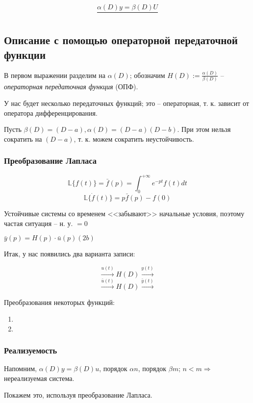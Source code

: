 \documentclass[main.tex]{subfiles}
\begin{document}
$$ \frac{\alpha(D)y = \beta(D)U}{ } $$ %

\subsection{Описание с помощью операторной передаточной функции}

В первом выражении разделим на $ \alpha(D) $; обозначим $ H(D) := \frac{\alpha(D)}{\beta(D)} $ -- \emph{операторная передаточная функция} (ОПФ).

У нас будет несколько передаточных функций; это -- операторная, т. к. зависит от оператора дифференцирования.

Пусть $ \beta(D) = (D - a), \alpha(D) = (D-a)(D-b) $. 
При этом нельзя сократить на $ (D - a) $, т. к. можем сократить неустойчивость. %

\subsubsection{Преобразование Лапласа}

$$ \mathds{L}\{f(t)\} = \bar{f}(p) = \int_0^{+\infty} e^{-pt} f(t) dt $$
$$ \mathds{L}\{\dot f (t)\} = p \bar{f}(p)- f(0) $$

Устойчивые системы со временем <<забывают>> начальные условия, поэтому частая ситуация -- н. у. $= 0$


$ \boxed{\bar{y}(p) = H(p) \cdot \bar{u}(p) }  (2b) $ %

Итак, у нас появились два варианта записи:

$$ \xrightarrow{u(t)} \boxed{H(D)}\xrightarrow{y(t)} $$
$$ \xrightarrow{\bar u(t)} \boxed{H(D)} \xrightarrow{ \bar y(t)} $$

Преобразования некоторых функций: %

\begin{enumerate}[noitemsep]
    \item
    \item
\end{enumerate}

\subsubsection{Реализуемость}

Напомним, $ \alpha(D)y = \beta(D) u $, порядок $ \alpha n $, порядок $ \beta m $; $ n < m \Rightarrow $ нереализуемая система.

Покажем это, используя преобразование Лапласа.
\end{document}
